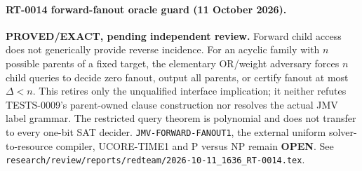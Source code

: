 \paragraph{RT-0014 forward-fanout oracle guard (11 October 2026).}
\textbf{PROVED/EXACT, pending independent review.}
Forward child access does not generically provide reverse incidence.  For an
acyclic family with $n$ possible parents of a fixed target, the elementary
OR/weight adversary forces $n$ child queries to decide zero fanout, output
all parents, or certify fanout at most $\Delta<n$.  This retires only the
unqualified interface implication; it neither refutes TESTS-0009's
parent-owned clause construction nor resolves the actual JMV label grammar.
The restricted query theorem is polynomial and does not transfer to every
one-bit SAT decider.  \texttt{JMV-FORWARD-FANOUT1}, the external uniform
solver-to-resource compiler, UCORE-TIME1 and P versus NP remain
\textbf{OPEN}.  See
\texttt{research/review/reports/redteam/2026-10-11\_1636\_RT-0014.tex}.
